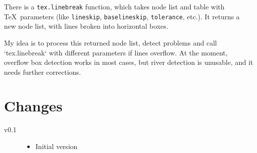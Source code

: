 \documentclass{l3doc}
\begin{document}
There is a \verb|tex.linebreak| function, which takes
node list and table with \TeX\ parameters (like \verb|lineskip|, \verb|baselineskip|, \verb|tolerance|,
etc.). It returns a new node list, with lines broken into horizontal boxes.

My idea is to process this returned node list, detect problems and call
`tex.linebreak` with different parameters if lines overflow. At the
moment, overflow box detection works in most cases, but river detection is unusable, and it needs further corrections.

\section{Changes}

\begin{description}
  \item[v0.1]
    \begin{itemize}
      \item Initial version
    \end{itemize}
\end{description}
\end{document}
